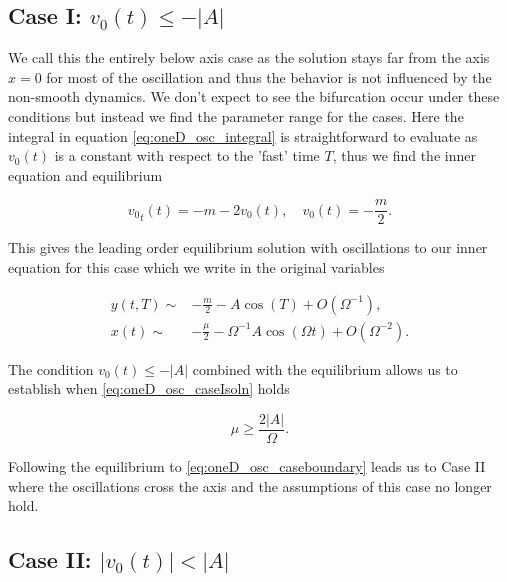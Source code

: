 \subsection{Case I: $v_0(t) \le -|A|$}
\label{subsec:oneD_osc_CaseI}

We call this the entirely below axis case as the solution stays far from the axis $x=0$ for most of the oscillation and thus the behavior is not influenced by the non-smooth dynamics. We don't expect to see the bifurcation occur under these conditions but instead we find the parameter range for the cases. Here the integral in equation \eqref{eq:oneD_osc_integral} is straightforward to evaluate as $v_0(t)$ is a constant with respect to the 'fast' time $T$, thus we find the inner equation and equilibrium

\begin{equation*}
{v_0}_t(t)=-m-2v_0(t),\quad v_0(t)=-\frac{m}{2}.
\end{equation*}

This gives the leading order equilibrium solution with oscillations to our inner equation for this case which we write in the original variables

\begin{equation}\label{eq:oneD_osc_caseIsoln}
\begin{aligned}
y(t,T)\sim& -\frac{m}{2}-A\cos(T)+O(\Omega^{-1}),\\ 
x(t)\sim& -\frac{\mu}{2}-\Omega^{-1} A\cos(\Omega t)+O(\Omega^{-2}).
\end{aligned}
\end{equation}

The condition $v_0(t)\le -|A|$ combined with the equilibrium allows us to establish when \eqref{eq:oneD_osc_caseIsoln} holds

\begin{equation}\label{eq:oneD_osc_caseboundary}
\mu\ge \frac{2|A|}{\Omega}.
\end{equation}

Following the equilibrium to \eqref{eq:oneD_osc_caseboundary} leads us to Case II where the oscillations cross the axis and the assumptions of this case no longer hold.

\subsection{Case II: $|v_0(t)|< |A|$}
\label{subsec:oneD_osc_CaseII}


